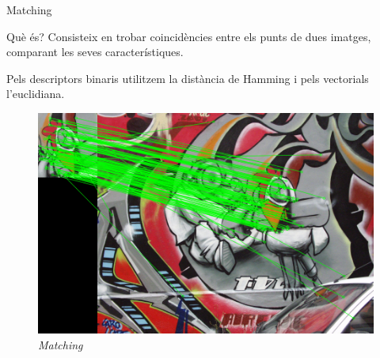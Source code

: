 \documentclass[xcolor=table, 11pt]{beamer}
\newcommand\tz{\fontsize{13}{15.6}\selectfont}
\begin{document}
	\begin{frame}{Matching}
		\tz
		\begin{minipage}{0.62\textwidth}
			\begin{block}{Què és?}
				Consisteix en trobar coincidències entre els punts de dues imatges, comparant les seves característiques.\par
				Pels descriptors binaris utilitzem la distància de Hamming i pels vectorials l'euclidiana.
			\end{block}
		\end{minipage}
		\hfill
		\begin{minipage}{0.36\textwidth}
			\begin{figure}[H]
				\vspace{0.8cm}
				\includegraphics[width=\textwidth]{images/matching}
				\caption{\textit{Matching}}
			\end{figure}
		\end{minipage}
	\end{frame}
\end{document}
